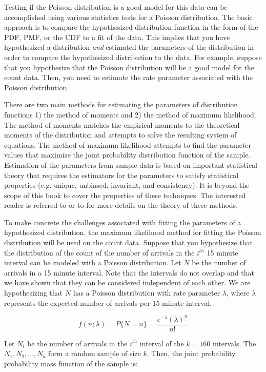 \documentclass[
]{book}
\theoremstyle{definition}
\theoremstyle{definition}
\theoremstyle{definition}
\theoremstyle{definition}
\theoremstyle{remark}
\begin{document}
Testing if the Poisson distribution is a good model for this data can be
accomplished using various statistics tests for a Poisson
distribution. The basic approach is to compare
the hypothesized distribution function in the form of the PDF, PMF, or
the CDF to a fit of the data. This implies that you have hypothesized a
distribution \emph{and} estimated the parameters of the distribution in order
to compare the hypothesized distribution to the data. For example,
suppose that you hypothesize that the Poisson distribution will be a
good model for the count data. Then, you need to estimate the rate
parameter associated with the Poisson distribution.

There are two main methods for estimating the parameters of distribution
functions 1) the method of moments and 2) the method of maximum
likelihood. The method of moments matches the empirical moments to the
theoretical moments of the distribution and attempts to solve the
resulting system of equations. The method of maximum likelihood attempts
to find the parameter values that maximize the joint probability
distribution function of the sample. Estimation of the parameters from
sample data is based on important statistical theory that requires the
estimators for the parameters to satisfy statistical properties (e.g.
unique, unbiased, invariant, and consistency). It is beyond the scope of
this book to cover the properties of these techniques. The interested
reader is referred to \citep{law2007simulation} or to
\citep{casella1990statistical} for more details on the theory of these
methods.

To make concrete the challenges associated with fitting the parameters
of a hypothesized distribution, the maximum likelihood method for
fitting the Poisson distribution will be used on the count data. Suppose
that you hypothesize that the distribution of the count of the number of
arrivals in the \(i^{th}\) 15 minute interval can be modeled with a
Poisson distribution. Let \(N\) be the number of arrivals in a 15 minute
interval. Note that the intervals do not overlap and that we have shown
that they can be considered independent of each other. We are
hypothesizing that \(N\) has a Poisson distribution with rate parameter
\(\lambda\), where \(\lambda\) represents the expected number of arrivals
per 15 minute interval.

\[f(n;\lambda) = P\{N=n\} = \frac{e^{-\lambda}\left(\lambda \right)^{n}}{n!}\]

Let \(N_{i}\) be the number of arrivals in the \(i^{th}\) interval of the
\(k=160\) intervals. The \(N_{1}, N_{2},...,N_{k}\) form a random sample of size \(k\).
Then, the joint probability probability mass function of the sample is:
\end{document}
